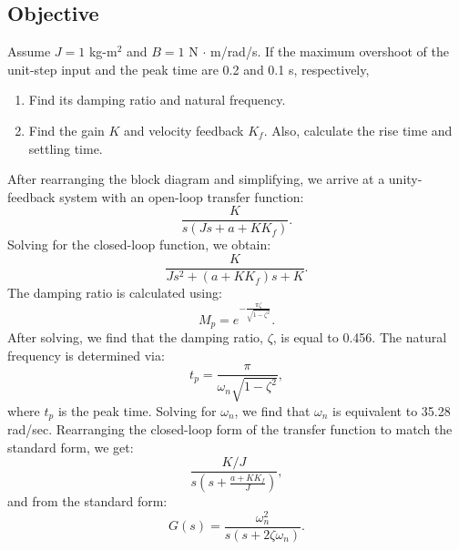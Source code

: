\documentclass[11pt]{article}
\begin{document}
\subsection*{Objective}

\noindent Assume \( J = 1 \) kg-m\(^2\) and \( B = 1 \) N \( \cdot \) m/rad/s. If the maximum overshoot of the unit-step input and the peak time are 0.2 and 0.1 s, respectively,

\begin{enumerate}
    \item Find its damping ratio and natural frequency.
    \item Find the gain \( K \) and velocity feedback \( K_f \). Also, calculate the rise time and settling time.
\end{enumerate}

\newpage
\noindent
After rearranging the block diagram and simplifying, we arrive at a unity-feedback system with an open-loop transfer function:
\begin{equation*}
    \frac{K}{s(Js + a + KK_f)}.
\end{equation*}
Solving for the closed-loop function, we obtain:
\begin{equation*}
    \frac{K}{Js^2 + (a + KK_f)s + K}.
\end{equation*}
\newline\newline
\noindent
The damping ratio is calculated using:
\begin{equation*}
    M_p = e^{-\frac{\pi\zeta}{\sqrt{1-\zeta^2}}}.
\end{equation*}
After solving, we find that the damping ratio, \(\zeta\), is equal to 0.456.
\newline\newline
\noindent
The natural frequency is determined via:
\begin{equation*}
    t_p = \frac{\pi}{\omega_n \sqrt{1-\zeta^2}},
\end{equation*}
where \(t_p\) is the peak time. Solving for \(\omega_n\), we find that \(\omega_n\) is equivalent to 35.28 rad/sec.
\newline\newline
\noindent
Rearranging the closed-loop form of the transfer function to match the standard form, we get:
\begin{equation*}
    \frac{K/J}{s\left(s + \frac{a + KK_f}{J}\right)},
\end{equation*}
and from the standard form:
\begin{equation*}
    G(s) = \frac{\omega_n^2}{s(s + 2\zeta\omega_n)}.
\end{equation*}
\end{document}
